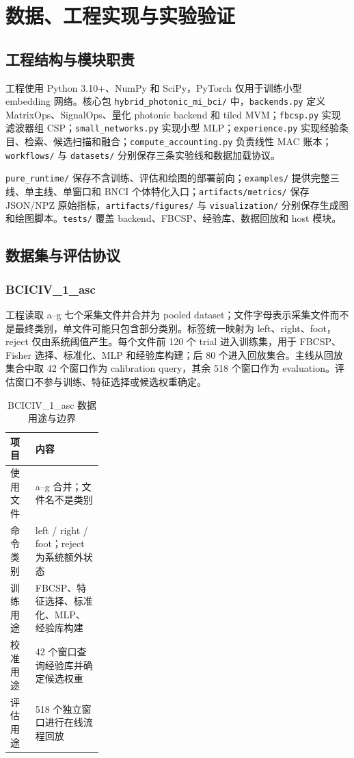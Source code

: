 \documentclass[
    TwoSide=false,
    Degree=graduate,
    GradLevel=master,
    Type=thesis,
    Title={光电混合运动想象脑机接口技术文档}
]{zjuthesis}
\begin{document}
\chapter{数据、工程实现与实验验证}
\section{工程结构与模块职责}
工程使用 Python 3.10+、NumPy 和 SciPy，PyTorch 仅用于训练小型 embedding 网络。核心包 \texttt{hybrid\_photonic\_mi\_bci/} 中，\texttt{backends.py} 定义 MatrixOps、SignalOps、量化 photonic backend 和 tiled MVM；\texttt{fbcsp.py} 实现滤波器组 CSP；\texttt{small\_networks.py} 实现小型 MLP；\texttt{experience.py} 实现经验条目、检索、候选扫描和融合；\texttt{compute\_accounting.py} 负责线性 MAC 账本；\texttt{workflows/} 与 \texttt{datasets/} 分别保存三条实验线和数据加载协议。

\texttt{pure\_runtime/} 保存不含训练、评估和绘图的部署前向；\texttt{examples/} 提供完整三线、单主线、单窗口和 BNCI 个体特化入口；\texttt{artifacts/metrics/} 保存 JSON/NPZ 原始指标，\texttt{artifacts/figures/} 与 \texttt{visualization/} 分别保存生成图和绘图脚本。\texttt{tests/} 覆盖 backend、FBCSP、经验库、数据回放和 host 模块。

\section{数据集与评估协议}
\subsection{BCICIV\_1\_asc}
工程读取 a--g 七个采集文件并合并为 pooled dataset；文件字母表示采集文件而不是最终类别，单文件可能只包含部分类别。标签统一映射为 left、right、foot，reject 仅由系统阈值产生。每个文件前 120 个 trial 进入训练集，用于 FBCSP、Fisher 选择、标准化、MLP 和经验库构建；后 80 个进入回放集合。主线从回放集合中取 42 个窗口作为 calibration query，其余 518 个窗口作为 evaluation。评估窗口不参与训练、特征选择或候选权重确定。
\begin{table}[H]\centering\small
\caption{BCICIV\_1\_asc 数据用途与边界}\label{tab:bciciv-protocol}
\begin{tabularx}{0.92\linewidth}{|L{0.27\linewidth}|X|}\hline
项目 & 内容 \\ \hline
使用文件 & a--g 合并；文件名不是类别 \\ \hline
命令类别 & left / right / foot；reject 为系统额外状态 \\ \hline
训练用途 & FBCSP、特征选择、标准化、MLP、经验库构建 \\ \hline
校准用途 & 42 个窗口查询经验库并确定候选权重 \\ \hline
评估用途 & 518 个独立窗口进行在线流程回放 \\ \hline
\end{tabularx}
\end{table}
\end{document}

